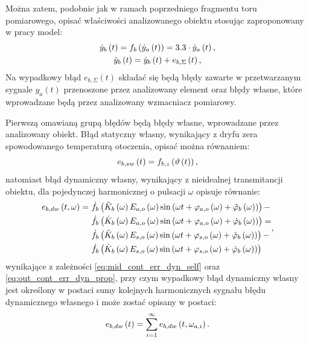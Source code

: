 Można zatem, podobnie jak w ramach poprzedniego fragmentu toru pomiarowego, opisać właściwości analizowanego obiektu stosując zaproponowany w pracy model:
\begin{gather}
\dot{y}_{b} \left(t\right) = f_{b} \left( \dot{y}_{a} \left(t\right) \right) = 3.3 \cdot \dot{y}_{a} \left(t\right) \label{eq:sym_partb_out_ideal}, \\
\tilde{y}_{b} \left(t\right) = \dot{y}_{b} \left(t\right) + e_{b,\Sigma} \left(t\right) \label{eq:sym_partb_out_real},
\end{gather}
Na wypadkowy błąd $e_{b,\Sigma}(t)$ składać się będą błędy zawarte w przetwarzanym sygnale $y_{a}(t)$ przenoszone przez analizowany element oraz błędy własne, które wprowadzane będą przez analizowany wzmacniacz pomiarowy.

Pierwszą omawianą grupą błędów będą błędy własne, wprowadzane przez analizowany obiekt. Błąd statyczny własny, wynikający z dryfu zera spowodowanego temperaturą otoczenia, opisać można równaniem:
\begin{equation}
e_{b,sw} \left(t\right) = f_{b,z} \left( \vartheta \left(t\right) \right) \label{eq:sym_partb_err_sw},
\end{equation}
natomiast błąd dynamiczny własny, wynikający z nieidealnej transmitancji obiektu, dla pojedynczej harmonicznej o pulsacji $\omega$ opisuje równanie:
\begin{equation}
\begin{split}
e_{b,dw} \left(t,\omega\right) = ~
& \dot{f}_{b} \left( \tilde{K}_{b} \left(\omega\right) E_{a,o} \left(\omega\right) \sin \left( \omega t + \varphi_{a,o} \left(\omega\right) + \tilde{\varphi}_{b} \left(\omega\right) \right) \right)- \\
& \dot{f}_{b} \left( \dot{K}_{b} \left(\omega\right) E_{a,o} \left(\omega\right) \sin \left( \omega t + \varphi_{a,o} \left(\omega\right) + \dot{\varphi}_{b} \left(\omega\right) \right) \right) = \\
& \dot{f}_{b} \left( \tilde{K}_{b} \left(\omega\right) E_{s,o} \left(\omega\right) \sin \left( \omega t + \varphi_{s,o} \left(\omega\right) + \tilde{\varphi}_{b} \left(\omega\right) \right) \right) - \\
& \dot{f}_{b} \left( \dot{K}_{b} \left(\omega\right) E_{s,o} \left(\omega\right) \sin \left( \omega t + \varphi_{s,o} \left(\omega\right) + \dot{\varphi}_{b} \left(\omega\right) \right) \right)
\end{split}
\label{eq:sym_partb_dyn_self_err},
\end{equation}
wynikające z zależności \eqref{eq:mid_cont_err_dyn_self} oraz \eqref{eq:out_cont_err_dyn_prop}, przy czym wypadkowy błąd dynamiczny własny jest określony w postaci sumy kolejnych harmonicznych sygnału błędu dynamicznego własnego i może zostać opisany w postaci:
\begin{equation}
e_{b,dw} \left(t\right) = \sum _{i = 1} ^{\infty} e_{b,dw} \left(t,\omega_{a,i}\right) \label{eq:sym_partb_dyn_self_sum}.
\end{equation}

